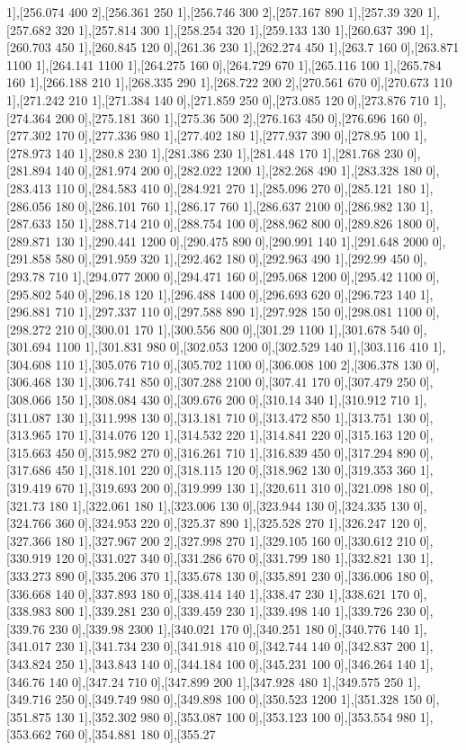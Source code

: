 {1],[256.074 400 2],[256.361 250 1],[256.746 300 2],[257.167 890 1],[257.39 320 1],[257.682 320 1],[257.814 300 1],[258.254 320 1],[259.133 130 1],[260.637 390 1],[260.703 450 1],[260.845 120 0],[261.36 230 1],[262.274 450 1],[263.7 160 0],[263.871 1100 1],[264.141 1100 1],[264.275 160 0],[264.729 670 1],[265.116 100 1],[265.784 160 1],[266.188 210 1],[268.335 290 1],[268.722 200 2],[270.561 670 0],[270.673 110 1],[271.242 210 1],[271.384 140 0],[271.859 250 0],[273.085 120 0],[273.876 710 1],[274.364 200 0],[275.181 360 1],[275.36 500 2],[276.163 450 0],[276.696 160 0],[277.302 170 0],[277.336 980 1],[277.402 180 1],[277.937 390 0],[278.95 100 1],[278.973 140 1],[280.8 230 1],[281.386 230 1],[281.448 170 1],[281.768 230 0],[281.894 140 0],[281.974 200 0],[282.022 1200 1],[282.268 490 1],[283.328 180 0],[283.413 110 0],[284.583 410 0],[284.921 270 1],[285.096 270 0],[285.121 180 1],[286.056 180 0],[286.101 760 1],[286.17 760 1],[286.637 2100 0],[286.982 130 1],[287.633 150 1],[288.714 210 0],[288.754 100 0],[288.962 800 0],[289.826 1800 0],[289.871 130 1],[290.441 1200 0],[290.475 890 0],[290.991 140 1],[291.648 2000 0],[291.858 580 0],[291.959 320 1],[292.462 180 0],[292.963 490 1],[292.99 450 0],[293.78 710 1],[294.077 2000 0],[294.471 160 0],[295.068 1200 0],[295.42 1100 0],[295.802 540 0],[296.18 120 1],[296.488 1400 0],[296.693 620 0],[296.723 140 1],[296.881 710 1],[297.337 110 0],[297.588 890 1],[297.928 150 0],[298.081 1100 0],[298.272 210 0],[300.01 170 1],[300.556 800 0],[301.29 1100 1],[301.678 540 0],[301.694 1100 1],[301.831 980 0],[302.053 1200 0],[302.529 140 1],[303.116 410 1],[304.608 110 1],[305.076 710 0],[305.702 1100 0],[306.008 100 2],[306.378 130 0],[306.468 130 1],[306.741 850 0],[307.288 2100 0],[307.41 170 0],[307.479 250 0],[308.066 150 1],[308.084 430 0],[309.676 200 0],[310.14 340 1],[310.912 710 1],[311.087 130 1],[311.998 130 0],[313.181 710 0],[313.472 850 1],[313.751 130 0],[313.965 170 1],[314.076 120 1],[314.532 220 1],[314.841 220 0],[315.163 120 0],[315.663 450 0],[315.982 270 0],[316.261 710 1],[316.839 450 0],[317.294 890 0],[317.686 450 1],[318.101 220 0],[318.115 120 0],[318.962 130 0],[319.353 360 1],[319.419 670 1],[319.693 200 0],[319.999 130 1],[320.611 310 0],[321.098 180 0],[321.73 180 1],[322.061 180 1],[323.006 130 0],[323.944 130 0],[324.335 130 0],[324.766 360 0],[324.953 220 0],[325.37 890 1],[325.528 270 1],[326.247 120 0],[327.366 180 1],[327.967 200 2],[327.998 270 1],[329.105 160 0],[330.612 210 0],[330.919 120 0],[331.027 340 0],[331.286 670 0],[331.799 180 1],[332.821 130 1],[333.273 890 0],[335.206 370 1],[335.678 130 0],[335.891 230 0],[336.006 180 0],[336.668 140 0],[337.893 180 0],[338.414 140 1],[338.47 230 1],[338.621 170 0],[338.983 800 1],[339.281 230 0],[339.459 230 1],[339.498 140 1],[339.726 230 0],[339.76 230 0],[339.98 2300 1],[340.021 170 0],[340.251 180 0],[340.776 140 1],[341.017 230 1],[341.734 230 0],[341.918 410 0],[342.744 140 0],[342.837 200 1],[343.824 250 1],[343.843 140 0],[344.184 100 0],[345.231 100 0],[346.264 140 1],[346.76 140 0],[347.24 710 0],[347.899 200 1],[347.928 480 1],[349.575 250 1],[349.716 250 0],[349.749 980 0],[349.898 100 0],[350.523 1200 1],[351.328 150 0],[351.875 130 1],[352.302 980 0],[353.087 100 0],[353.123 100 0],[353.554 980 1],[353.662 760 0],[354.881 180 0],[355.27 }
